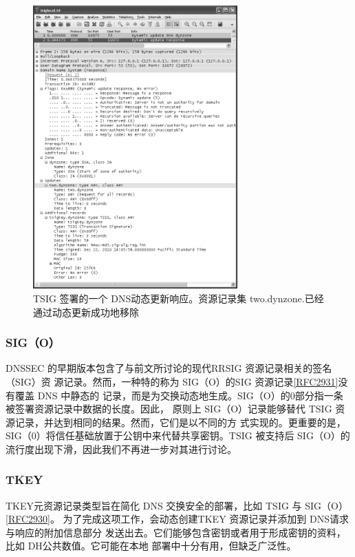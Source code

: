 \begin{figure}[!htb]
    \centering
	\includegraphics[width=0.7\textwidth]{imgs/18/18-46.png}
	\caption{TSIG 签署的一个 DNS动态更新响应。资源记录集 two.dynzone.已经通过动态更新成功地移除}
\end{figure}

\subsubsection{SIG（O）}
DNSSEC 的早期版本包含了与前文所讨论的现代RRSIG 资源记录相关的签名（SIG）资
源记录。然而，一种特的称为 SIG（O）的SIG 资源记录\href{https://www.rfc-editor.org/rfc/rfc2931}{[RFC2931]}没有覆盖 DNS 中静态的
记录，而是为交换动态地生成。SIG（O）的0部分指一条被签署资源记录中数据的长度。因此，
原则上 SIG（O）记录能够替代 TSIG 资源记录，并达到相同的结果。然而，它们是以不同的方
式实现的。更重要的是，SIG（0）将信任基础放置于公钥中来代替共享密钥。TSIG 被支持后
SIG（O）的流行度出现下滑，因此我们不再进一步对其进行讨论。

\subsubsection{TKEY}
TKEY元资源记录类型旨在简化 DNS 交换安全的部署，比如 TSIG 与 SIG（O）\href{https://www.rfc-editor.org/rfc/rfc2930}{[RFC2930]}。
为了完成这项工作，会动态创建TKEY 资源记录并添加到 DNS请求与响应的附加信息部分
发送出去。它们能够包含密钥或者用于形成密钥的资料，比如 DH公共数值。它可能在本地
部署中十分有用，但缺乏广泛性。
